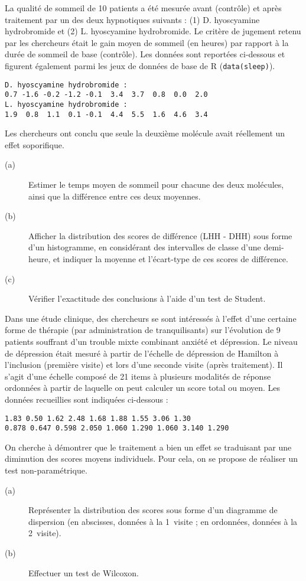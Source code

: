 \begin{exo}\label{exo:3.2}
La qualité de sommeil de 10 patients a été mesurée avant (contrôle) et après
traitement par un des deux hypnotiques suivants : (1) D. hyoscyamine
hydrobromide et (2) L. hyoscyamine hydrobromide. Le critère de jugement
retenu par les chercheurs était le gain moyen de sommeil (en heures) par
rapport à la durée de sommeil de base
(contrôle). \autocite[p.~20]{student08} Les données sont reportées
ci-dessous et figurent également parmi les jeux de données de base de R
(\verb|data(sleep)|).  
\begin{verbatim}
D. hyoscyamine hydrobromide :
0.7 -1.6 -0.2 -1.2 -0.1  3.4  3.7  0.8  0.0  2.0
L. hyoscyamine hydrobromide :
1.9  0.8  1.1  0.1 -0.1  4.4  5.5  1.6  4.6  3.4
\end{verbatim}

Les chercheurs ont conclu que seule la deuxième molécule avait réellement un
effet soporifique. 
\begin{description}
\item[(a)] Estimer le temps moyen de sommeil pour chacune des deux
  molécules, ainsi que la différence entre ces deux moyennes.
\item[(b)] Afficher la distribution des scores de différence (LHH - DHH)
  sous forme d'un histogramme, en considérant des intervalles de classe
  d'une demi-heure, et indiquer la moyenne et l'écart-type de ces scores de
  différence.
\item[(c)] Vérifier l'exactitude des conclusions à l'aide d'un test de Student.
\end{description}
\end{exo}

\begin{exo}\label{exo:3.3}
Dans une étude clinique, des chercheurs se sont intéressés à l'effet d'une
certaine forme de thérapie (par administration de tranquilisants) sur
l'évolution de 9 patients souffrant d'un trouble mixte combinant anxiété et
dépression. Le niveau de dépression était mesuré à partir de l'échelle de
dépression de Hamilton à l'inclusion (première visite) et lors d'une seconde
visite (après traitement). Il s'agit d'une échelle composé de 21 items à
plusieurs modalités de réponse ordonnées à partir de laquelle on peut
calculer un score total ou moyen. Les données recueillies sont indiquées
ci-dessous :\autocite[p.~29]{hollander99}
\begin{verbatim}
1.83 0.50 1.62 2.48 1.68 1.88 1.55 3.06 1.30
0.878 0.647 0.598 2.050 1.060 1.290 1.060 3.140 1.290
\end{verbatim}
On cherche à démontrer que le traitement a bien un effet se traduisant par
une diminution des scores moyens individuels. Pour cela, on se propose de
réaliser un test non-paramétrique.
\begin{description}
\item[(a)] Représenter la distribution des scores sous forme
  d'un diagramme de dispersion (en abscisses, données à la 1\iere\ visite ; en
  ordonnées, données à la 2\ieme\ visite).
\item[(b)] Effectuer un test de Wilcoxon.
\end{description}
\end{exo}

